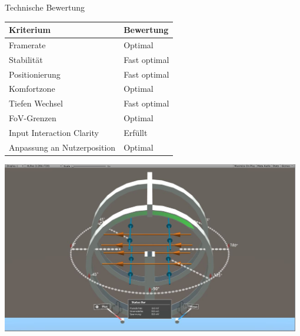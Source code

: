 \begin{frame}[fragile]{Technische Bewertung}
\begin{minipage}{0.62\textwidth}
\bgroup
\setlength\extrarowheight{1pt}
\def\arraystretch{1.1}
\begin{table}
	\centering
	\begin{tabular}{m{4.1cm}|l}
		Kriterium & Bewertung \\
		\hline
		Framerate & Optimal\\
		\hline
		Stabilität & Fast optimal\\
		\hline
		Positionierung & Fast optimal\\
		\hline
		Komfortzone & Optimal\\
		\hline
		Tiefen Wechsel & Fast optimal\\
		\hline
		FoV-Grenzen & Optimal\\
		\hline
		Input Interaction Clarity & Erfüllt\\
		\hline
		Anpassung an Nutzerposition & Optimal\\
	\end{tabular}
\end{table}
\setlength\extrarowheight{0pt}
\def\arraystretch{1}
\egroup
\end{minipage}
\begin{minipage}{0.35\textwidth}
	\includegraphics[width=0.98\textwidth]{images/unity/fov.JPG}\\
	

\end{minipage}
\end{frame}
